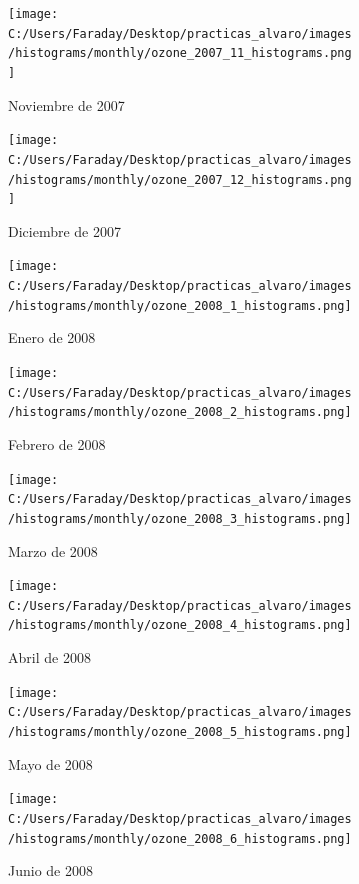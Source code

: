 \documentclass[12pt]{article}
\begin{document}
\begin{figure}[H]
\centering
\begin{subfigure}[h]{0.45\textwidth}
\texttt{[image: C:/Users/Faraday/Desktop/practicas\_alvaro/images/histograms/monthly/ozone\_2007\_11\_histograms.png]}
\caption{Noviembre de 2007}
\label{fig:hist-mon-2-11-2007}
\end{subfigure}
%
\begin{subfigure}[H]{0.45\textwidth}
\texttt{[image: C:/Users/Faraday/Desktop/practicas\_alvaro/images/histograms/monthly/ozone\_2007\_12\_histograms.png]}
\caption{Diciembre de 2007}
\label{fig:hist-mon-2-12-2007}
\end{subfigure}
\caption{}
\end{figure}

\newpage

\begin{figure}[H]
\centering
\begin{subfigure}[h]{0.45\textwidth}
\texttt{[image: C:/Users/Faraday/Desktop/practicas\_alvaro/images/histograms/monthly/ozone\_2008\_1\_histograms.png]}
\caption{Enero de 2008}
\label{fig:hist-mon-2-1-2008}
\end{subfigure}
%
\begin{subfigure}[H]{0.45\textwidth}
\texttt{[image: C:/Users/Faraday/Desktop/practicas\_alvaro/images/histograms/monthly/ozone\_2008\_2\_histograms.png]}
\caption{Febrero de 2008}
\label{fig:hist-mon-2-2-2008}
\end{subfigure}
\caption{}
\end{figure}

\begin{figure}[H]
\centering
\begin{subfigure}[h]{0.45\textwidth}
\texttt{[image: C:/Users/Faraday/Desktop/practicas\_alvaro/images/histograms/monthly/ozone\_2008\_3\_histograms.png]}
\caption{Marzo de 2008}
\label{fig:hist-mon-2-3-2008}
\end{subfigure}
%
\begin{subfigure}[H]{0.45\textwidth}
\texttt{[image: C:/Users/Faraday/Desktop/practicas\_alvaro/images/histograms/monthly/ozone\_2008\_4\_histograms.png]}
\caption{Abril de 2008}
\label{fig:hist-mon-2-4-2008}
\end{subfigure}
\caption{}
\end{figure}

\begin{figure}[H]
\centering
\begin{subfigure}[h]{0.45\textwidth}
\texttt{[image: C:/Users/Faraday/Desktop/practicas\_alvaro/images/histograms/monthly/ozone\_2008\_5\_histograms.png]}
\caption{Mayo de 2008}
\label{fig:hist-mon-2-5-2008}
\end{subfigure}
%
\begin{subfigure}[H]{0.45\textwidth}
\texttt{[image: C:/Users/Faraday/Desktop/practicas\_alvaro/images/histograms/monthly/ozone\_2008\_6\_histograms.png]}
\caption{Junio de 2008}
\label{fig:hist-mon-2-6-2008}
\end{subfigure}
\caption{}
\end{figure}
\end{document}
